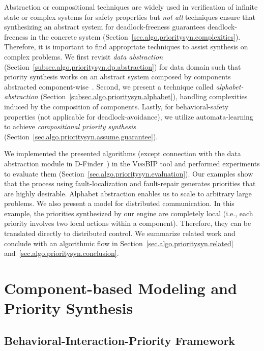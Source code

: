 \documentclass[10pt, a4paper, onecolumn, conference, compsocconf]{IEEEtran}
\begin{document}
Abstraction or compositional techniques are widely used in verification of infinite state or complex systems for safety properties
but \emph{not all} techniques ensure that synthesizing an abstract system for
deadlock-freeness guarantees deadlock-freeness in the concrete system (Section~\ref{sec.algo.prioritysyn.complexities}).
Therefore, it is important to find appropriate techniques to assist synthesis on complex problems.
We first revisit \emph{data abstraction} (Section~\ref{subsec.algo.prioritysyn.dp.abstraction}) for data domain such that priority synthesis works on an abstract system composed by components abstracted component-wise~\cite{bensalem2008compositional}.
Second, we present a technique called \emph{alphabet-abstraction} (Section~\ref{subsec.algo.prioritysyn.alphabet}), handling complexities induced by the composition of components.
Lastly, for behavioral-safety properties (not applicable for deadlock-avoidance),
we utilize automata-learning~\cite{angluin1987learning} to achieve \emph{compositional priority synthesis} (Section~\ref{sec.algo.prioritysyn.assume.guarantee}).

We implemented the presented algorithms (except connection with the data abstraction module in D-Finder~\cite{bensalem:dfinder2:2011}) in the \textsc{VissBIP} tool and performed experiments to evaluate them (Section~\ref{sec.algo.prioritysyn.evaluation}).  Our examples show that the process using fault-localization and fault-repair generates priorities that are highly desirable.  Alphabet abstraction enables us to scale to arbitrary large problems.  We also present a model for distributed communication.  In this example, the priorities synthesized by our engine are completely local (i.e., each priority involves two local actions within a component). Therefore, they can be translated directly to distributed control.  We summarize related work and conclude with an algorithmic flow in Section~\ref{sec.algo.prioritysyn.related} and~\ref{sec.algo.prioritysyn.conclusion}.


\section{Component-based Modeling and Priority Synthesis\label{sec.algo.prioritysyn.bip}}

\subsection{Behavioral-Interaction-Priority Framework}
\end{document}
